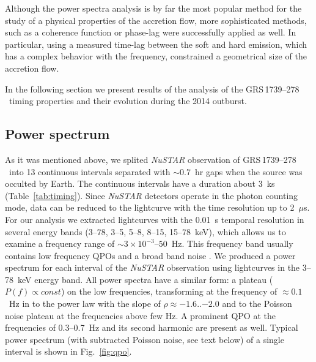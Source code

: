 \documentclass[a4paper,fleqn,usenatbib]{mnras}
\def\grs{{GRS\,1739--278\,}}
\begin{document}
Although the power spectra analysis is by far the most popular method for the study of a physical properties of the accretion flow, more sophisticated methods, such as a coherence function or phase-lag were successfully applied as well. 
In particular, using a measured time-lag between the soft and hard emission, which has a complex behavior with the frequency, \citet{1999ApJ...517..355N} constrained a geometrical size of the accretion flow. 


In the following section we present results of the analysis of the \grs\ timing properties and their evolution during the 2014 outburst.

\subsection{Power spectrum}

As it was mentioned above, we splited {\it NuSTAR} observation of \grs\ into 13 continuous intervals separated with $\sim0.7$~hr gaps when the source was occulted by Earth. 
The continuous intervals have a duration about 3~ks (Table~\ref{tab:timing}).
Since {\it NuSTAR} detectors operate in the photon counting mode, data can be reduced to the lightcurve with the time resolution up to 2~$\mu$s.
For our analysis we extracted lightcurves with the 0.01~s temporal resolution in several energy bands (3--78, 3--5, 5--8, 8--15, 15--78~keV), which allows us to examine a frequency range of $\sim3\times10^{-3}$--$50$~Hz.
This frequency band usually contains low frequency QPOs and a broad band noise \citep{wijnands99}.
We produced a power spectrum for each interval of the {\it NuSTAR} observation using lightcurves in the 3--78~keV energy band.
All power spectra have a similar form: a plateau ($P(f)\propto const$) on the low frequencies, transforming at the frequency of $\approx0.1$~Hz in to the power law with the slope of $\rho\approx-1.6$..$-2.0$ and to the Poisson noise plateau at the frequencies above few Hz. 
A prominent QPO at the frequencies of 0.3--0.7~Hz and its second harmonic are present as well. 
Typical power spectrum (with subtracted Poisson noise, see text below) of a single interval is shown in Fig.~\ref{fig:qpo}.
\end{document}
